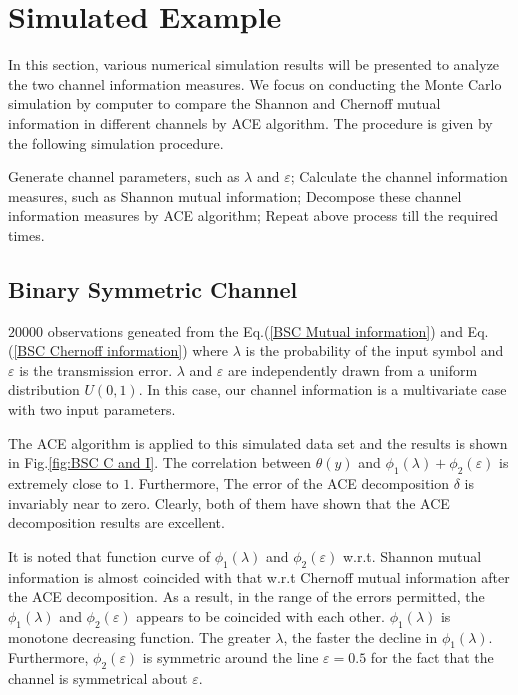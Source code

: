 \documentclass[conference]{IEEEtran}
\begin{document}
\section{Simulated Example}
In this section, various numerical simulation results will be presented to analyze the two channel information measures. We focus on conducting the Monte Carlo simulation by computer to compare the Shannon and Chernoff mutual information in different channels by ACE algorithm. The procedure is given by the following simulation procedure.
\begin{algorithm}[htb]
\caption*{Simulation Procedure}
\label{alg:simulated}
\begin{algorithmic}[1]
\STATE Generate channel parameters, such as $\lambda$ and $\varepsilon$;
\STATE Calculate the channel information measures, such as Shannon mutual information;
\STATE Decompose these channel information measures by ACE algorithm;
\STATE Repeat above process till the required times.
\end{algorithmic}
\end{algorithm}

\subsection{Binary Symmetric Channel}
$20000$ observations geneated from the Eq.(\ref{BSC Mutual information}) and Eq.(\ref{BSC Chernoff information}) where $\lambda$ is the probability of the input symbol and $\varepsilon$ is the transmission error. $\lambda$ and $\varepsilon$ are independently drawn from a uniform distribution $U(0,1)$. In this case, our channel information is a multivariate case with two input parameters.

The ACE algorithm is applied to this simulated data set and the results is shown in Fig.\ref{fig:BSC C and I}. The correlation between $\theta(y)$ and $\phi_1(\lambda)+\phi_2(\varepsilon)$ is extremely close to $1$. Furthermore, The error of the ACE decomposition $\delta$ is invariably near to zero. Clearly, both of them have shown that the ACE decomposition results are excellent. 

It is noted that function curve of $\phi_1(\lambda)$ and $\phi_2(\varepsilon)$ w.r.t. Shannon mutual information is almost coincided with that w.r.t Chernoff mutual information after the ACE decomposition. As a result, in the range of the errors permitted, the $\phi_1(\lambda)$ and $\phi_2(\varepsilon)$ appears to be coincided with each other. $\phi_1(\lambda)$ is monotone decreasing function. The greater $\lambda$, the faster the decline in $\phi_1(\lambda)$. Furthermore, $\phi_2(\varepsilon)$ is symmetric around the line $\varepsilon = 0.5$ for the fact that the channel is symmetrical about $\varepsilon$.
\end{document}
